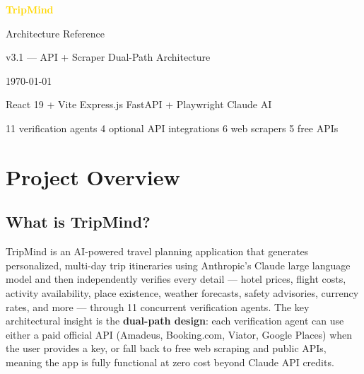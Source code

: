 \documentclass[11pt,a4paper]{article}
\begin{document}
\begin{titlepage}
    \centering
    \vspace*{3cm}
    {\Huge\bfseries\textcolor{gold}{TripMind}\par}
    \vspace{0.5cm}
    {\Large Architecture Reference\par}
    \vspace{0.3cm}
    {\large v3.1 --- API + Scraper Dual-Path Architecture\par}
    \vspace{2cm}
    {\large\today\par}
    \vfill
    {\small
    React 19 + Vite \textbullet{} Express.js \textbullet{} FastAPI + Playwright \textbullet{} Claude AI\par
    \vspace{0.3cm}
    11 verification agents \textbullet{} 4 optional API integrations \textbullet{} 6 web scrapers \textbullet{} 5 free APIs\par
    }
\end{titlepage}

\tableofcontents
\newpage

\section{Project Overview}

\subsection{What is TripMind?}

TripMind is an AI-powered travel planning application that generates personalized, multi-day trip itineraries using Anthropic's Claude large language model and then independently verifies every detail --- hotel prices, flight costs, activity availability, place existence, weather forecasts, safety advisories, currency rates, and more --- through 11 concurrent verification agents. The key architectural insight is the \textbf{dual-path design}: each verification agent can use either a paid official API (Amadeus, Booking.com, Viator, Google Places) when the user provides a key, or fall back to free web scraping and public APIs, meaning the app is fully functional at zero cost beyond Claude API credits.
\end{document}
